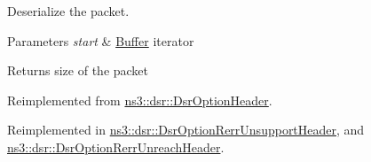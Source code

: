 Deserialize the packet. 


\begin{DoxyParams}{Parameters}
{\em start} & \hyperlink{classns3_1_1Buffer}{Buffer} iterator \\
\hline
\end{DoxyParams}
\begin{DoxyReturn}{Returns}
size of the packet 
\end{DoxyReturn}


Reimplemented from \hyperlink{classns3_1_1dsr_1_1DsrOptionHeader_ab44c93c37011591950bb95730c1c5b06}{ns3\+::dsr\+::\+Dsr\+Option\+Header}.



Reimplemented in \hyperlink{classns3_1_1dsr_1_1DsrOptionRerrUnsupportHeader_ad568e52cacee0c67a43338e8838806a5}{ns3\+::dsr\+::\+Dsr\+Option\+Rerr\+Unsupport\+Header}, and \hyperlink{classns3_1_1dsr_1_1DsrOptionRerrUnreachHeader_ab6cda2c6108b5a5076941b7f541ef320}{ns3\+::dsr\+::\+Dsr\+Option\+Rerr\+Unreach\+Header}.


